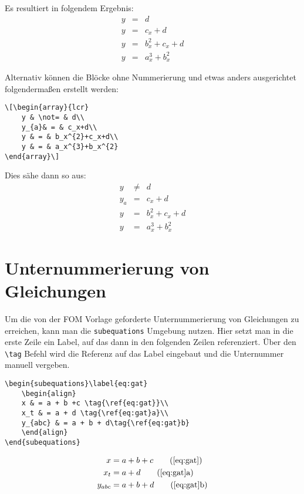 Es resultiert in folgendem Ergebnis:
\begin{align}
    y &=& d\\
    y &=& c_x+d\\
    y &=& b_x^{2}+c_x+d\\
    y &=& a_x^{3}+b_x^{2}
\end{align}

Alternativ können die Blöcke ohne Nummerierung und etwas anders ausgerichtet folgendermaßen erstellt werden:
\begin{lstlisting}
\[\begin{array}{lcr}
    y & \not= & d\\
    y_{a}& = & c_x+d\\
    y & = & b_x^{2}+c_x+d\\
    y & = & a_x^{3}+b_x^{2}
\end{array}\]
\end{lstlisting}

Dies sähe dann so aus:
\[\begin{array}{lcr}
    y & \not= & d\\
    y_{a}& = & c_x+d\\
    y & = & b_x^{2}+c_x+d\\
    y & = & a_x^{3}+b_x^{2}
\end{array}\]

\section{Unternummerierung von Gleichungen}
Um die von der FOM Vorlage geforderte Unternummerierung von Gleichungen zu erreichen, kann man die \texttt{subequations} Umgebung nutzen. Hier setzt man in die erste Zeile ein Label, auf das dann in den folgenden Zeilen referenziert. Über den \texttt{\textbackslash tag} Befehl wird die Referenz auf das Label eingebaut und die Unternummer manuell vergeben.
\begin{lstlisting}
\begin{subequations}\label{eq:gat}
    \begin{align}
    x & = a + b +c \tag{\ref{eq:gat}}\\
    x_t & = a + d \tag{\ref{eq:gat}a}\\
    y_{abc} & = a + b + d\tag{\ref{eq:gat}b}
    \end{align}
\end{subequations}
\end{lstlisting}
\begin{subequations}\label{eq:gat}
    \begin{align}
    x & = a + b +c \tag{\ref{eq:gat}}\\
    x_t & = a + d   \tag{\ref{eq:gat}a}\\
    y_{abc} & = a + b + d\tag{\ref{eq:gat}b}
    \end{align}
\end{subequations}


